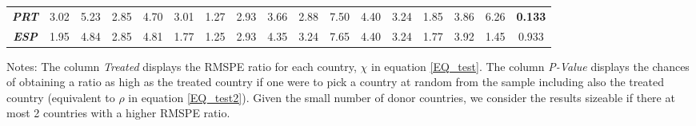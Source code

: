 \documentclass[12pt]{article}
\newcommand{\annote}[1]{\parbox{\textwidth}{\renewcommand{\baselinestretch}{1.0}\vspace{12pt} \small Notes: #1}}
\begin{document}
\begin{appendices}
\begin{landscape}
\begin{table}[htbp]
\begin{tabular}{cccccccccccccccc|c}
\textit{\textbf{PRT}} & 3.02 & 5.23 & 2.85 & 4.70 & 3.01 & 1.27 & 2.93 & 3.66 & 2.88 & 7.50 & 4.40 & 3.24 & 1.85 & 3.86 & 6.26  & \textbf{0.133} \\
\textit{\textbf{ESP}} & 1.95 & 4.84 & 2.85 & 4.81 & 1.77 & 1.25 & 2.93 & 4.35 & 3.24 & 7.65 & 4.40 & 3.24 & 1.77 & 3.92 & 1.45  & 0.933 \\
\bottomrule
\end{tabular} 
\annote{The column \textit{Treated} displays the RMSPE ratio for each country, $\chi$ in equation \ref{EQ_test}. The column \textit{P-Value} displays the chances of obtaining a ratio as high as the treated country if one were to pick a country at random from the sample including also the treated country (equivalent to $\rho$ in equation \ref{EQ_test2}). Given the small number of donor countries, we consider the results sizeable if there at most 2 countries with a higher RMSPE ratio.}
\end{table}

\end{landscape}

\clearpage


\end{appendices}
\end{document}
